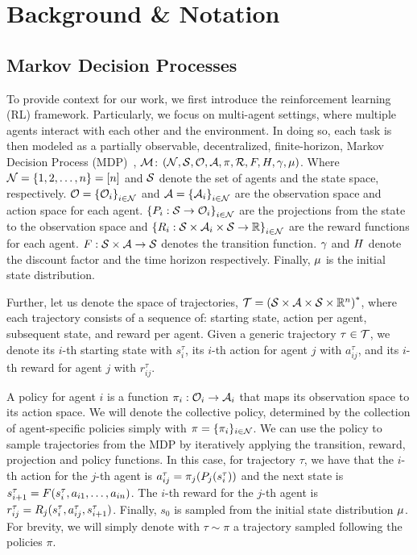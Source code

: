 \section{Background \& Notation}\label{sect:background}

\subsection{Markov Decision Processes}
To provide context for our work, we first introduce the reinforcement learning (RL) framework. 
Particularly, we focus on multi-agent settings, where multiple agents interact with each other and the environment.
In doing so, each task is then modeled as a partially observable, decentralized, finite-horizon, Markov Decision Process (MDP)~\cite{Shapley53}, $\mathcal{M}$: $(\mathcal{N},\mathcal{S},\mathcal{O},\mathcal{A},\pi, \mathcal{R}, F, H, \gamma, \mu)$. Where $\mathcal{N}=\{1, 2, \dots, n\}=[n]$ and $\mathcal{S}$ denote the set of agents and the state space, respectively. $\mathcal{O}={\{\mathcal{O}_{i}\}}_{i\in\mathcal{N}}$ and $\mathcal{A}={\{\mathcal{A}_{i}\}}_{i\in\mathcal{N}}$ are the observation space and action space for each agent. ${\{P_{i}:\mathcal{S}\rightarrow\mathcal{O}_{i}\}}_{i\in\mathcal{N}}$ are the projections from the state to the observation space and ${\{R_{i}:\mathcal{S}\times\mathcal{A}_{i}\times\mathcal{S}\rightarrow\mathbb{R}\}}_{i\in\mathcal{N}}$ are the reward functions for each agent. $F:\mathcal{S}\times\mathcal{A}\rightarrow\mathcal{S}$ denotes the transition function. $\gamma$ and $H$ denote the discount factor and the time horizon respectively. Finally, $\mu$ is the initial state distribution.

Further, let us denote the space of trajectories, $\mathcal{T} = {\left(\mathcal{S}\times\mathcal{A}\times\mathcal{S}\times\mathbb{R}^{n}\right)}^*$, where each trajectory consists of a sequence of: starting state, action per agent, subsequent state, and reward per agent. Given a generic trajectory $\tau\in\mathcal{T}$, we denote its $i$-th starting state with $s_i^\tau$, its $i$-th action for agent $j$ with $a_{ij}^\tau$, and its $i$-th reward for agent $j$ with $r_{ij}^\tau$. 

A policy for agent $i$ is a function $\pi_{i}:\mathcal{O}_{i}\rightarrow\mathcal{A}_{i}$ that maps its observation space to its action space. We will denote the collective policy, determined by the collection of agent-specific policies simply with $\pi=\{\pi_{i}\}_{i\in\mathcal{N}}$. We can use the policy to sample trajectories from the MDP by iteratively applying the transition, reward, projection and policy functions. In this case, for trajectory $\tau$, we have that the $i$-th action for the $j$-th agent is $a_{ij}^\tau = \pi_{j}(P_{j}(s_i^\tau))$ and the next state is $s_{i+1}^\tau = F(s_i^\tau,a_{i1},\dots,a_{in})$. The $i$-th reward for the $j$-th agent is $r_{ij}^\tau = R_{j}(s_i^\tau,a_{ij}^\tau,s_{i+1}^\tau)$. Finally, $s_0$ is sampled from the initial state distribution $\mu$. For brevity, we will simply denote with $\tau\sim\pi$ a trajectory sampled following the policies $\pi$.

